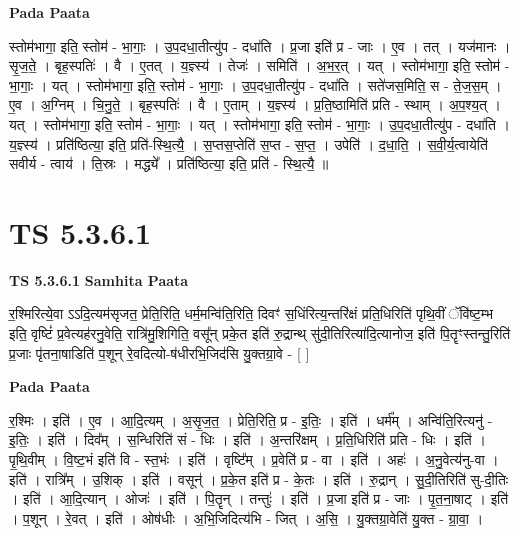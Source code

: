 \documentclass[17pt]{extarticle}
\begin{document}
\textbf{Pada Paata} \newline

स्तोम॑भागा॒ इति॒ स्तोम॑ - भा॒गाः॒ । उ॒प॒दधा॒तीत्यु॑प - दधा॑ति । प्र॒जा इति॑ प्र - जाः । ए॒व । तत् । यज॑मानः । सृ॒ज॒ते॒ । बृह॒स्पतिः॑ । वै । ए॒तत् । य॒ज्ञ्स्य॑ । तेजः॑ । समिति॑ । अ॒भ॒र॒त् । यत् । स्तोम॑भागा॒ इति॒ स्तोम॑ - भा॒गाः॒ । यत् । स्तोम॑भागा॒ इति॒ स्तोम॑ - भा॒गाः॒ । उ॒प॒दधा॒तीत्यु॑प - दधा॑ति । सते॑जस॒मिति॒ स - ते॒ज॒स॒म् । ए॒व । अ॒ग्निम् । चि॒नु॒ते॒ । बृह॒स्पतिः॑ । वै । ए॒ताम् । य॒ज्ञ्स्य॑ । प्र॒ति॒ष्ठामिति॑ प्रति - स्थाम् । अ॒प॒श्य॒त् । यत् । स्तोम॑भागा॒ इति॒ स्तोम॑ - भा॒गाः॒ । यत् । स्तोम॑भागा॒ इति॒ स्तोम॑ - भा॒गाः॒ । उ॒प॒दधा॒तीत्यु॑प - दधा॑ति । य॒ज्ञ्स्य॑ । प्रति॑ष्ठित्या॒ इति॒ प्रति॑-स्थि॒त्यै॒ । स॒प्तस॒प्तेति॑ स॒प्त - स॒प्त॒ । उपेति॑ । द॒धा॒ति॒ । स॒वी॒र्य॒त्वायेति॑ सवीर्य - त्वाय॑ । ति॒स्रः । मद्ध्ये᳚ । प्रति॑ष्ठित्या॒ इति॒ प्रति॑ - स्थि॒त्यै॒ ॥  \newline





\section{ TS 5.3.6.1 }

\textbf{TS 5.3.6.1 } \newline
\textbf{Samhita Paata} \newline

र॒श्मिरित्ये॒वा ऽऽदि॒त्यम॑सृजत॒ प्रेति॒रिति॒ धर्म॒मन्वि॑ति॒रिति॒ दिवꣳ॑ स॒धिंरित्य॒न्तरि॑क्षं प्रति॒धिरिति॑ पृथि॒वीं ॅवि॑ष्ट॒म्भ इति॒ वृष्टिं॑ प्र॒वेत्यह॑रनु॒वेति॒ रात्रि॑मु॒शिगिति॒ वसू᳚न् प्रके॒त इति॑ रु॒द्रान्थ् सु॑दी॒तिरित्या॑दि॒त्यानोज॒ इति॑ पि॒तॄꣳस्तन्तु॒रिति॑ प्र॒जाः पृ॑तना॒षाडिति॑ प॒शून् रे॒वदित्यो-ष॑धीरभि॒जिद॑सि यु॒क्तग्रा॒वे - [  ] \newline

\textbf{Pada Paata} \newline

र॒श्मिः । इति॑ । ए॒व । आ॒दि॒त्यम् । अ॒सृ॒ज॒त॒ । प्रेति॒रिति॒ प्र - इ॒तिः॒ । इति॑ । धर्म᳚म् । अन्वि॑ति॒रित्यनु॑ - इ॒तिः॒ । इति॑ । दिव᳚म् । स॒न्धिरिति॑ सं - धिः । इति॑ । अ॒न्तरि॑क्षम् । प्र॒ति॒धिरिति॑ प्रति - धिः । इति॑ । पृ॒थि॒वीम् । वि॒ष्ट॒भं इति॑ वि - स्त॒भंः । इति॑ । वृष्टि᳚म् । प्र॒वेति॑ प्र - वा । इति॑ । अहः॑ । अ॒नु॒वेत्य॑नु-वा । इति॑ । रात्रि᳚म् । उ॒शिक् । इति॑ । वसून्॑ । प्र॒के॒त इति॑ प्र - के॒तः । इति॑ । रु॒द्रान् । सु॒दी॒तिरिति॑ सु-दी॒तिः । इति॑ । आ॒दि॒त्यान् । ओजः॑ । इति॑ । पि॒तॄन् । तन्तुः॑ । इति॑ । प्र॒जा इति॑ प्र - जाः । पृ॒त॒ना॒षाट् । इति॑ । प॒शून् । रे॒वत् । इति॑ । ओष॑धीः । अ॒भि॒जिदित्य॑भि - जित् । अ॒सि॒ । यु॒क्तग्रा॒वेति॑ यु॒क्त - ग्रा॒वा॒ ।  \newline
\end{document}
